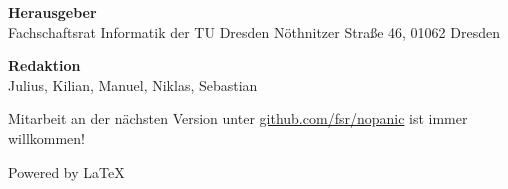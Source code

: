 \newpage
\thispagestyle{empty} %
\color{white}
\textbf{Herausgeber} \\
Fachschaftsrat Informatik der TU Dresden
Nöthnitzer Straße 46, 01062 Dresden

\textbf{Redaktion} \\
Julius,
Kilian,
Manuel,
Niklas,
Sebastian

Mitarbeit an der nächsten Version unter \url{github.com/fsr/nopanic} ist immer willkommen!

Powered by \LaTeX

\AddToShipoutPicture*{\BackcoverPic} %

